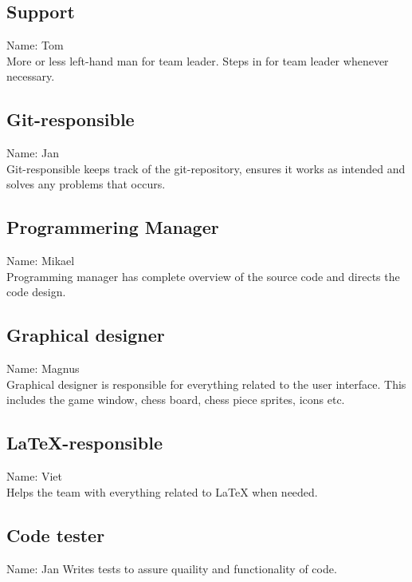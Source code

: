\documentclass{article}
\begin{document}
\subsection*{Support}
Name: Tom\\
More or less left-hand man for team leader. Steps in for team leader whenever necessary.

\subsection*{Git-responsible}
Name: Jan\\
Git-responsible keeps track of the git-repository, ensures it works as intended and solves any problems that occurs.

\subsection*{Programmering Manager}
Name: Mikael\\
Programming manager has complete overview of the source code and directs the code design.

\subsection*{Graphical designer}
Name: Magnus\\
Graphical designer is responsible for everything related to the user interface. This includes the game window, chess board, chess piece sprites, icons etc.

\subsection*{LaTeX-responsible}
Name: Viet\\
Helps the team with everything related to LaTeX when needed.

\subsection*{Code tester}
Name: Jan
Writes tests to assure quaility and functionality of code.
\end{document}
